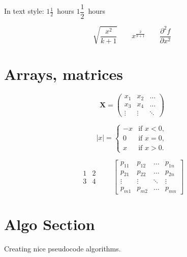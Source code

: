 \documentclass{article}
\begin{document}
In text style:
$1\frac{1}{2}$~hours \qquad
$1\dfrac{1}{2}$~hours

\begin{equation*}
  \sqrt{\frac{x^2}{k+1}}\qquad
  x^\frac{2}{k+1}\qquad
  \frac{\partial^2f}
  {\partial x^2}
\end{equation*}

\section{Arrays, matrices}


  \begin{equation*}
    \mathbf{X} = \left(
      \begin{array}{ccc}
        x_1 & x_2 & \ldots \\
        x_3 & x_4 & \ldots \\
        \vdots & \vdots & \ddots
      \end{array} \right)
  \end{equation*}

\bigskip
\begin{equation*}
  |x| = \left\{
    \begin{array}{rl}
      -x & \text{if } x < 0,\\
      0 & \text{if } x = 0,\\
      x & \text{if } x > 0.
    \end{array} \right.
\end{equation*}

\bigskip
\begin{equation*}
  \begin{matrix}
1 & 2 \\
3&4 \end{matrix} \qquad \begin{bmatrix}
    p_{11} & p_{12} & \ldots
    & p_{1n} \\
    p_{21} & p_{22} & \ldots
    & p_{2n} \\
    \vdots & \vdots & \ddots
    & \vdots \\
    p_{m1} & p_{m2} & \ldots
    & p_{mn}
  \end{bmatrix}
\end{equation*}

\section{Algo Section}

Creating nice pseudocode algorithms.
\end{document}
